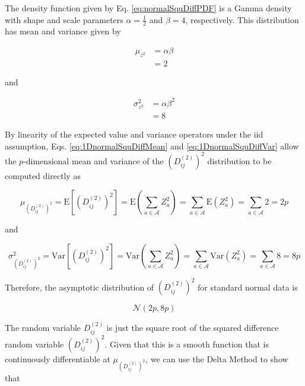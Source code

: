 \documentclass[10pt,letterpaper]{article}\usepackage[]{graphicx}\usepackage[]{color}
\begin{document}
The density function given by Eq. \ref{eq:normalSquDiffPDF} is a Gamma density with shape and scale parameters $\alpha = \frac{1}{2}$ and $\beta = 4$, respectively. This distribution has mean and variance given by

\begin{equation}\label{eq:1DnormalSquDiffMean}
\begin{aligned}
\mu_{z^2} &= \alpha \beta \\
&= 2
\end{aligned}
\end{equation}

\noindent and

\begin{equation}\label{eq:1DnormalSquDiffVar}
\begin{aligned}
\sigma^2_{z^2} &= \alpha \beta^2 \\
&= 8
\end{aligned}
\end{equation}

By linearity of the expected value and variance operators under the iid assumption, Eqs. \ref{eq:1DnormalSquDiffMean} and \ref{eq:1DnormalSquDiffVar} allow the $p \text{-dimensional}$ mean and variance of the $\left(D^{(2)}_{ij}\right)^2$ distribution to be computed directly as

\begin{equation}\label{eq:normalSquDiffMean}
\mu_{\left(D^{(2)}_{ij}\right)^2} = \text{E}\left[\left(D^{(2)}_{ij}\right)^2\right] = \text{E}\left(\sum_{a \in \mathcal{A}} Z^2_a\right) = \sum_{a \in \mathcal{A}} \text{E}\left(Z^2_a\right) = \sum_{a \in \mathcal{A}} 2 = 2p
\end{equation}

\noindent and

\begin{equation}\label{eq:normalSquDiffVar}
\sigma^2_{\left(D^{(2)}_{ij}\right)^2} = \text{Var}\left[\left(D^{(2)}_{ij}\right)^2\right] = \text{Var}\left(\sum_{a \in \mathcal{A}} Z^2_a\right) = \sum_{a \in \mathcal{A}} \text{Var}\left(Z^2_a\right) = \sum_{a \in \mathcal{A}} 8 = 8p
\end{equation}

Therefore, the asymptotic distribution of $\left(D^{(2)}_{ij}\right)^2$ for standard normal data is

\begin{equation}\label{eq:SquDiffDistr}
\mathcal{N}(2p,8p)
\end{equation}

The random variable $D^{(2)}_{ij}$ is just the square root of the squared difference random variable $\left(D^{(2)}_{ij}\right)^2$. Given that this is a smooth function that is continuously differentiable at $\mu_{\left(D^{(2)}_{ij}\right)^2}$, we can use the Delta Method \cite{allStats} to show that
\end{document}
